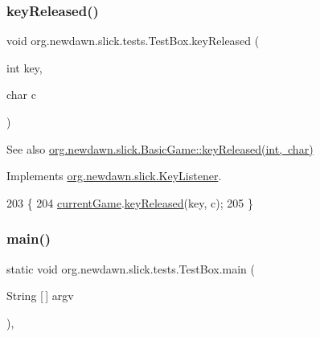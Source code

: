 \subsubsection{\texorpdfstring{key\+Released()}{keyReleased()}}
{\footnotesize\ttfamily void org.\+newdawn.\+slick.\+tests.\+Test\+Box.\+key\+Released (\begin{DoxyParamCaption}\item[{int}]{key,  }\item[{char}]{c }\end{DoxyParamCaption})\hspace{0.3cm}{\ttfamily [inline]}}

\begin{DoxySeeAlso}{See also}
\mbox{\hyperlink{classorg_1_1newdawn_1_1slick_1_1_basic_game_ae8ce436f93206f0b251a0fbf2a345849}{org.\+newdawn.\+slick.\+Basic\+Game\+::key\+Released(int, char)}} 
\end{DoxySeeAlso}


Implements \mbox{\hyperlink{interfaceorg_1_1newdawn_1_1slick_1_1_key_listener_a474673b59bc77266bcef3c261c26ee2b}{org.\+newdawn.\+slick.\+Key\+Listener}}.


\begin{DoxyCode}
203                                              \{
204         \mbox{\hyperlink{classorg_1_1newdawn_1_1slick_1_1tests_1_1_test_box_a5e0fdb2f97173d828af597044c525078}{currentGame}}.\mbox{\hyperlink{classorg_1_1newdawn_1_1slick_1_1_basic_game_ae8ce436f93206f0b251a0fbf2a345849}{keyReleased}}(key, c);
205     \}
\end{DoxyCode}
\mbox{\label{classorg_1_1newdawn_1_1slick_1_1tests_1_1_test_box_a0da3b7951c5a5d4c547e7adb89d0520d}} 
\subsubsection{\texorpdfstring{main()}{main()}}
{\footnotesize\ttfamily static void org.\+newdawn.\+slick.\+tests.\+Test\+Box.\+main (\begin{DoxyParamCaption}\item[{String \mbox{[}$\,$\mbox{]}}]{argv }\end{DoxyParamCaption})\hspace{0.3cm}{\ttfamily [inline]}, {\ttfamily [static]}}

